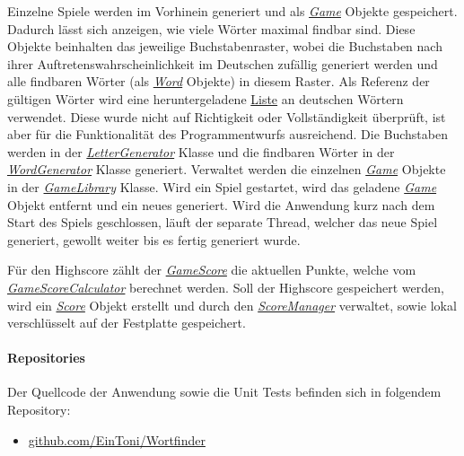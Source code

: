 Einzelne Spiele werden im Vorhinein generiert und als \href{https://github.com/EinToni/Wortfinder/blob/main/Wortfinder/Game.cs}{\textit{Game}} Objekte gespeichert. Dadurch lässt sich anzeigen, wie viele Wörter maximal findbar sind. Diese Objekte beinhalten das jeweilige Buchstabenraster, wobei die Buchstaben nach ihrer Auftretenswahrscheinlichkeit im Deutschen zufällig generiert werden und alle findbaren Wörter (als \href{https://github.com/EinToni/Wortfinder/blob/main/Wortfinder/Word.cs}{\textit{Word}} Objekte) in diesem Raster. Als Referenz der gültigen Wörter wird eine heruntergeladene \href{https://github.com/EinToni/Wortfinder/blob/main/Wortfinder/wordListGerman.txt}{Liste} an deutschen Wörtern verwendet. Diese wurde nicht auf Richtigkeit oder Vollständigkeit überprüft, ist aber für die Funktionalität des Programmentwurfs ausreichend.
Die Buchstaben werden in der \href{https://github.com/EinToni/Wortfinder/blob/main/Wortfinder/LetterGenerator.cs}{\textit{LetterGenerator}} Klasse und die findbaren Wörter in der \href{https://github.com/EinToni/Wortfinder/blob/main/Wortfinder/WordGenerator.cs}{\textit{WordGenerator}} Klasse generiert. Verwaltet werden die einzelnen \href{https://github.com/EinToni/Wortfinder/blob/main/Wortfinder/Game.cs}{\textit{Game}} Objekte in der \href{https://github.com/EinToni/Wortfinder/blob/main/Wortfinder/GameLibrary.cs}{\textit{GameLibrary}} Klasse. 
Wird ein Spiel gestartet, wird das geladene \href{https://github.com/EinToni/Wortfinder/blob/main/Wortfinder/Game.cs}{\textit{Game}} Objekt entfernt und ein neues generiert. Wird die Anwendung kurz nach dem Start des Spiels geschlossen, läuft der separate Thread, welcher das neue Spiel generiert, gewollt weiter bis es fertig generiert wurde.


Für den Highscore zählt der \href{https://github.com/EinToni/Wortfinder/blob/main/Wortfinder/GameScore.cs}{\textit{GameScore}} die aktuellen Punkte, welche vom \href{https://github.com/EinToni/Wortfinder/blob/main/Wortfinder/GameScoreCalculator.cs}{\textit{GameScoreCalculator}} berechnet werden. Soll der Highscore gespeichert werden, wird ein \href{https://github.com/EinToni/Wortfinder/blob/main/Wortfinder/Score.cs}{\textit{Score}} Objekt erstellt und durch den \href{https://github.com/EinToni/Wortfinder/blob/main/Wortfinder/ScoreManager.cs}{\textit{ScoreManager}} verwaltet, sowie lokal verschlüsselt auf der Festplatte gespeichert.

\paragraph{Repositories}
Der Quellcode der Anwendung sowie die Unit Tests befinden sich in folgendem Repository:
\begin{itemize}
\item{\href{https://github.com/EinToni/Wortfinder}{github.com/EinToni/Wortfinder}}
\end{itemize}

